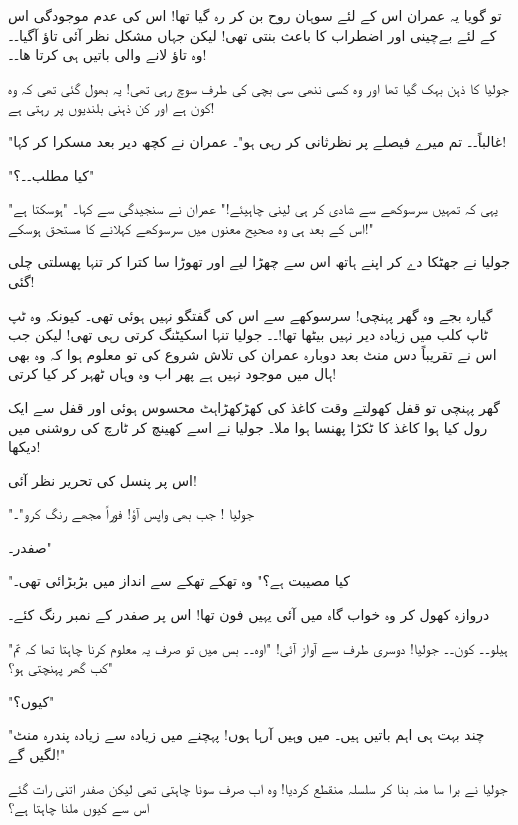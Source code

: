 تو گویا یہ عمران اس کے لئے سوہان روح بن کر رہ گیا تھا! اس کی عدم موجودگی اس کے لئے بےچینی اور اضطراب کا باعث بنتی تھی! لیکن جہاں مشکل نظر آئی تاؤ آگیا۔۔ وہ تاؤ لانے والی باتیں ہی کرتا ھا۔۔!

جولیا کا ذہن بہک گیا تھا اور وہ کسی ننھی سی بچی کی طرف سوچ رہی تھی! یہ بھول گئی تھی کہ وہ کون ہے اور کن ذہنی بلندیوں پر رہتی ہے!

"غالباً۔۔ تم میرے فیصلے پر نظرثانی کر رہی ہو"۔ عمران نے کچھ دیر بعد مسکرا کر کہا!

"کیا مطلب۔۔؟"

"یہی کہ تمہیں سرسوکھے سے شادی کر ہی لینی چاہیئے!" عمران نے سنجیدگی سے کہا۔ "ہوسکتا ہے اس کے بعد ہی وہ صحیح معنوں میں سرسوکھے کہلانے کا مستحق ہوسکے!"

جولیا نے جھٹکا دے کر اپنے ہاتھ اس سے چھڑا لیے اور تھوڑا سا کترا کر تنہا پھسلتی چلی گئی!




\endR

\bigskip\bigskip\bigskip

\centerline{}
\bigskip\bigskip\bigskip
\beginR
\body



گیارہ بجے وہ گھر پہنچی! سرسوکھے سے اس کی گفتگو نہیں ہوئی تھی۔ کیونکہ وہ ٹپ ٹاپ کلب میں زیادہ دیر نہیں بیٹھا تھا!۔۔ جولیا تنہا اسکیٹنگ کرتی رہی تھی! لیکن جب اس نے تقریباً دس منٹ بعد دوبارہ عمران کی تلاش شروع کی تو معلوم ہوا کہ وہ بھی ہال میں موجود نہیں ہے پھر اب وہ وہاں ٹھہر کر کیا کرتی!

گھر پہنچی تو قفل کھولتے وقت کاغذ کی کھڑکھڑاہٹ محسوس ہوئی اور قفل سے ایک رول کیا ہوا کاغذ کا ٹکڑا پھنسا ہوا ملا۔
جولیا نے اسے کھینچ کر ٹارچ کی روشنی میں دیکھا!

اس پر پنسل کی تحریر نظر آئی!

"جولیا ! جب بھی واپس آؤ! فوراً مجھے رنگ کرو"۔

صفدر۔"

"کیا مصیبت ہے؟" وہ تھکے تھکے سے انداز میں بڑبڑائی تھی۔

دروازہ کھول کر وہ خواب گاہ میں آئی یہیں فون تھا! اس پر صفدر کے نمبر رنگ کئے۔

"ہیلو۔۔ کون۔۔ جولیا! دوسری طرف سے آواز آئی! "اوہ۔۔ بس میں تو صرف یہ معلوم کرنا چاہتا تھا کہ تم کب گھر پہنچتی ہو؟"

"کیوں؟"

"چند بہت ہی اہم باتیں ہیں۔ میں وہیں آرہا ہوں! پہچنے میں زیادہ سے زیادہ پندرہ منٹ لگیں گے!"

جولیا نے برا سا منہ بنا کر سلسلہ منقطع کردیا! وہ اب صرف سونا چاہتی تھی لیکن صفدر اتنی رات گئے اس سے کیوں ملنا چاہتا ہے؟

